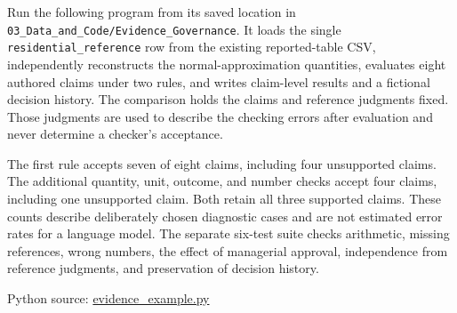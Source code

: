 \noindent \noindent Run the following program from its saved location in
\texttt{03\_Data\_and\_Code/Evidence\_Governance}. It loads the single
\texttt{residential\_reference} row from the existing reported-table
CSV, independently reconstructs the normal-approximation quantities,
evaluates eight authored claims under two rules, and writes claim-level
results and a fictional decision history. The comparison holds the
claims and reference judgments fixed. Those judgments are used to
describe the checking errors after evaluation and never determine a
checker's acceptance.

The first rule accepts seven of eight claims, including four unsupported
claims. The additional quantity, unit, outcome, and number checks accept
four claims, including one unsupported claim. Both retain all three
supported claims. These counts describe deliberately chosen diagnostic
cases and are not estimated error rates for a language model. The
separate six-test suite checks arithmetic, missing references, wrong
numbers, the effect of managerial approval, independence from reference
judgments, and preservation of decision history.

\FloatBarrier
{}
Python source:
\href{../03_Data_and_Code/Evidence_Governance/evidence_example.py}{evidence\_example.py}

